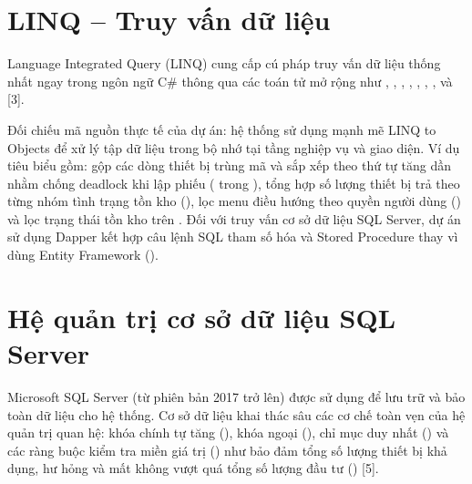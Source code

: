 \section{LINQ – Truy vấn dữ liệu}

Language Integrated Query (LINQ) cung cấp cú pháp truy vấn dữ liệu thống nhất ngay trong ngôn ngữ C\# thông qua các toán tử mở rộng như , , , , , , ,  và  [3].


Đối chiếu mã nguồn thực tế của dự án: hệ thống sử dụng mạnh mẽ LINQ to Objects để xử lý tập dữ liệu trong bộ nhớ tại tầng nghiệp vụ và giao diện. Ví dụ tiêu biểu gồm: gộp các dòng thiết bị trùng mã và sắp xếp theo thứ tự  tăng dần nhằm chống deadlock khi lập phiếu ( trong ), tổng hợp số lượng thiết bị trả theo từng nhóm tình trạng tồn kho (), lọc menu điều hướng theo quyền người dùng () và lọc trạng thái tồn kho trên . Đối với truy vấn cơ sở dữ liệu SQL Server, dự án sử dụng Dapper kết hợp câu lệnh SQL tham số hóa và Stored Procedure thay vì dùng Entity Framework ().


\section{Hệ quản trị cơ sở dữ liệu SQL Server}

Microsoft SQL Server (từ phiên bản 2017 trở lên) được sử dụng để lưu trữ và bảo toàn dữ liệu cho hệ thống. Cơ sở dữ liệu  khai thác sâu các cơ chế toàn vẹn của hệ quản trị quan hệ: khóa chính tự tăng (), khóa ngoại (), chỉ mục duy nhất () và các ràng buộc kiểm tra miền giá trị () như bảo đảm tổng số lượng thiết bị khả dụng, hư hỏng và mất không vượt quá tổng số lượng đầu tư () [5].



